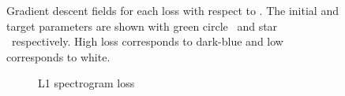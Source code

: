\begin{figure}[htbp]
    \caption{Gradient descent fields for each loss with respect to \AmpMod. The initial and target parameters are shown with green circle \greencircle~and star \greenstar~respectively. High loss corresponds to dark-blue and low corresponds to white.}
    \label{fig:p2_losses}
\end{figure}

\begin{figure}[htbp]
    \centering
    \begin{subfigure}[b]{0.49\textwidth}
        \centering
        \caption{L1 spectrogram loss}
        \label{fig:p3_spec}
    \end{subfigure}
    \hfill
    \begin{subfigure}[b]{0.49\textwidth}
        \centering

\end{subfigure}
\end{figure}
